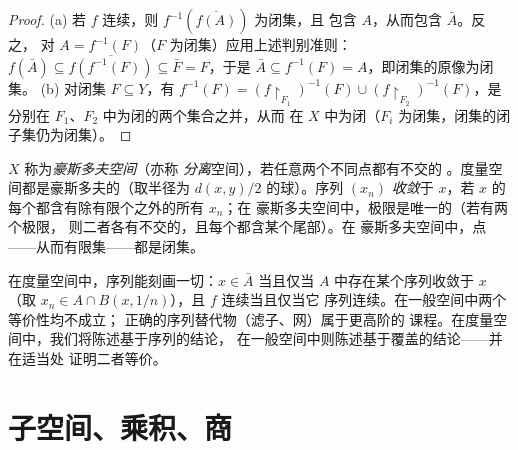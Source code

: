 \begin{proof}
(a) 若 $f$ 连续，则 $f^{-1}(\overline{f(A)})$ 为闭集，且
包含 $A$，从而包含 $\bar A$。反之，
对 $A = f^{-1}(F)$（$F$ 为闭集）应用上述判别准则：$f(\bar A) \subseteq
\overline{f(f^{-1}(F))} \subseteq \bar F = F$，于是 $\bar A
\subseteq f^{-1}(F) = A$，即闭集的原像为闭集。
(b) 对闭集 $F \subseteq Y$，有 $f^{-1}(F) =
(f\restriction_{F_1})^{-1}(F) \cup (f\restriction_{F_2})^{-1}
(F)$，是分别在 $F_1$、$F_2$ 中为闭的两个集合之并，从而
在 $X$ 中为闭（$F_i$ 为闭集，闭集的闭子集仍为闭集）。
\end{proof}

\begin{definition}\label{def:b3:topology:hausdorff}
$X$ 称为\emph{豪斯多夫空间}（亦称
\emph{分离}空间），若任意两个不同点都有不交的
。度量空间都是豪斯多夫的（取半径为
$d(x,y)/2$ 的球）。序列 $(x_n)$ \emph{收敛}于 $x$，若
$x$ 的每个都含有除有限个之外的所有 $x_n$；在
豪斯多夫空间中，极限是唯一的（若有两个极限，
则二者各有不交的，且每个都含某个尾部）。在
豪斯多夫空间中，点——从而有限集——都是闭集。
\end{definition}

\begin{remark}\label{rem:b3:topology:sequences}
在度量空间中，序列能刻画一切：$x \in \bar A$
当且仅当 $A$ 中存在某个序列收敛于 $x$（取 $x_n \in A \cap
B(x, 1/n)$），且 $f$ 连续当且仅当它
序列连续。在一般空间中两个等价性均不成立；
正确的序列替代物（滤子、网）属于更高阶的
课程。在度量空间中，我们将陈述基于序列的结论，
在一般空间中则陈述基于覆盖的结论——并在适当处
证明二者等价。
\end{remark}

\section{子空间、乘积、商}

